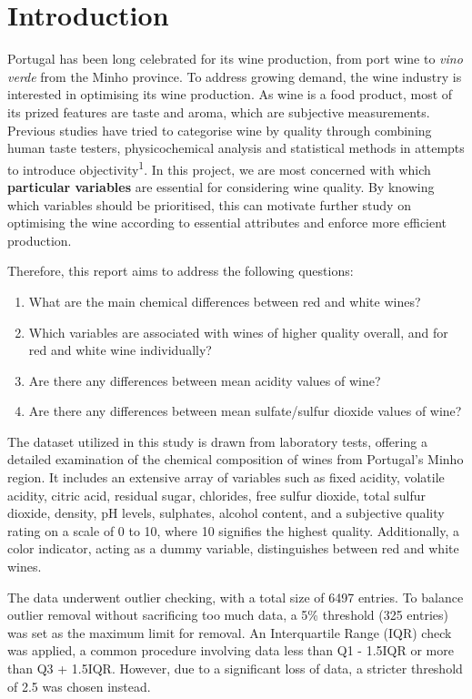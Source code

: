 \documentclass[
]{article}
\author{}
\date{\vspace{-2.5em}}
\providecommand{\tightlist}{%
  \setlength{\itemsep}{0pt}\setlength{\parskip}{0pt}}
\begin{document}
\section{Introduction}\label{introduction}

Portugal has been long celebrated for its wine production, from port
wine to \emph{vino verde} from the Minho province. To address growing
demand, the wine industry is interested in optimising its wine
production. As wine is a food product, most of its prized features are
taste and aroma, which are subjective measurements. Previous studies
have tried to categorise wine by quality through combining human taste
testers, physicochemical analysis and statistical methods in attempts to
introduce objectivity\textsuperscript{1}. In this project, we are most
concerned with which \textbf{particular variables} are essential for
considering wine quality. By knowing which variables should be
prioritised, this can motivate further study on optimising the wine
according to essential attributes and enforce more efficient production.

Therefore, this report aims to address the following questions:

\begin{enumerate}
\def\labelenumi{\arabic{enumi}.}
\tightlist
\item
  What are the main chemical differences between red and white wines?
\item
  Which variables are associated with wines of higher quality overall,
  and for red and white wine individually?
\item
  Are there any differences between mean acidity values of wine?
\item
  Are there any differences between mean sulfate/sulfur dioxide values
  of wine?
\end{enumerate}

The dataset utilized in this study is drawn from laboratory tests,
offering a detailed examination of the chemical composition of wines
from Portugal's Minho region. It includes an extensive array of
variables such as fixed acidity, volatile acidity, citric acid, residual
sugar, chlorides, free sulfur dioxide, total sulfur dioxide, density, pH
levels, sulphates, alcohol content, and a subjective quality rating on a
scale of 0 to 10, where 10 signifies the highest quality. Additionally,
a color indicator, acting as a dummy variable, distinguishes between red
and white wines.

The data underwent outlier checking, with a total size of 6497 entries.
To balance outlier removal without sacrificing too much data, a 5\%
threshold (325 entries) was set as the maximum limit for removal. An
Interquartile Range (IQR) check was applied, a common procedure
involving data less than Q1 - 1.5IQR or more than Q3 + 1.5IQR. However,
due to a significant loss of data, a stricter threshold of 2.5 was
chosen instead.
\end{document}
